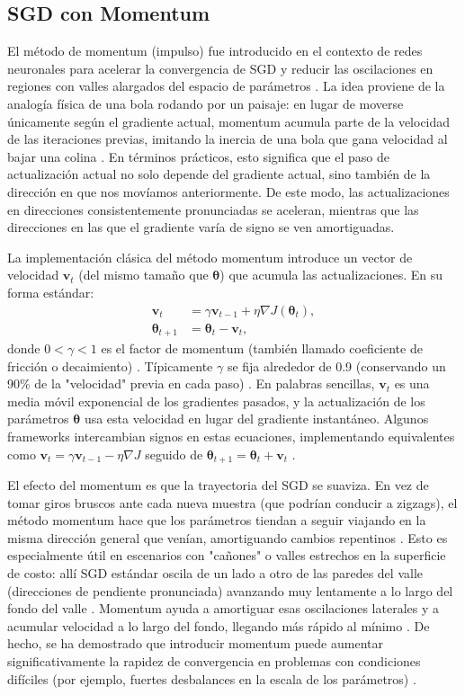 \documentclass[12pt, spanish]{article}
\begin{document}
\subsection{SGD con Momentum}
El método de momentum (impulso) fue introducido en el contexto de redes neuronales para acelerar la convergencia de SGD y reducir las oscilaciones en regiones con valles alargados del espacio de parámetros \cite{ref4}. La idea proviene de la analogía física de una bola rodando por un paisaje: en lugar de moverse únicamente según el gradiente actual, momentum acumula parte de la velocidad de las iteraciones previas, imitando la inercia de una bola que gana velocidad al bajar una colina \cite{ref4}. En términos prácticos, esto significa que el paso de actualización actual no solo depende del gradiente actual, sino también de la dirección en que nos movíamos anteriormente. De este modo, las actualizaciones en direcciones consistentemente pronunciadas se aceleran, mientras que las direcciones en las que el gradiente varía de signo se ven amortiguadas.

La implementación clásica del método momentum introduce un vector de velocidad $\mathbf{v}_t$ (del mismo tamaño que $\boldsymbol{\theta}$) que acumula las actualizaciones. En su forma estándar:
\begin{align*}
\mathbf{v}_t &= \gamma \mathbf{v}_{t-1} + \eta \nabla J(\boldsymbol{\theta}_t), \\
\boldsymbol{\theta}_{t+1} &= \boldsymbol{\theta}_t - \mathbf{v}_t,
\end{align*}
donde $0 < \gamma < 1$ es el factor de momentum (también llamado coeficiente de fricción o decaimiento) \cite{ref4}. Típicamente $\gamma$ se fija alrededor de 0.9 (conservando un 90\% de la "velocidad" previa en cada paso) \cite{ref4}. En palabras sencillas, $\mathbf{v}_t$ es una media móvil exponencial de los gradientes pasados, y la actualización de los parámetros $\boldsymbol{\theta}$ usa esta velocidad en lugar del gradiente instantáneo. Algunos frameworks intercambian signos en estas ecuaciones, implementando equivalentes como $\mathbf{v}_t = \gamma \mathbf{v}_{t-1} - \eta \nabla J$ seguido de $\boldsymbol{\theta}_{t+1} = \boldsymbol{\theta}_t + \mathbf{v}_t$ \cite{ref4}.

El efecto del momentum es que la trayectoria del SGD se suaviza. En vez de tomar giros bruscos ante cada nueva muestra (que podrían conducir a zigzags), el método momentum hace que los parámetros tiendan a seguir viajando en la misma dirección general que venían, amortiguando cambios repentinos \cite{ref4}. Esto es especialmente útil en escenarios con "cañones" o valles estrechos en la superficie de costo: allí SGD estándar oscila de un lado a otro de las paredes del valle (direcciones de pendiente pronunciada) avanzando muy lentamente a lo largo del fondo del valle \cite{ref4}. Momentum ayuda a amortiguar esas oscilaciones laterales y a acumular velocidad a lo largo del fondo, llegando más rápido al mínimo \cite{ref4}. De hecho, se ha demostrado que introducir momentum puede aumentar significativamente la rapidez de convergencia en problemas con condiciones difíciles (por ejemplo, fuertes desbalances en la escala de los parámetros) \cite{ref4}.
\end{document}
